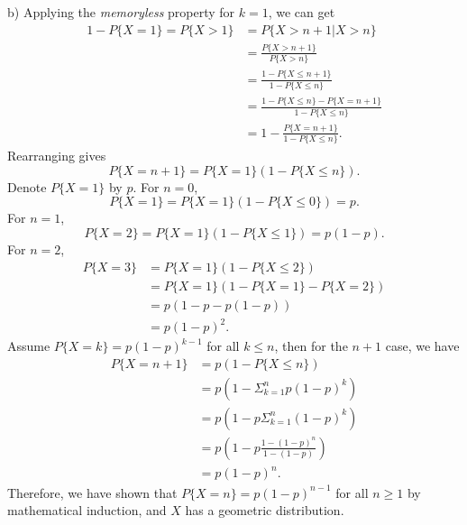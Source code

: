 \begin{solution}
  b) Applying the \textit{memoryless} property for $k=1$, we can get
  \begin{align*}
    1 - P\{X=1\} = P\{X>1\} &= P\{X>n+1|X>n\} \\
      &= \frac{P\{X>n+1\}}{P\{X>n\}} \\
      &= \frac{1 - P\{X\leq n+1\}}{1 - P\{X\leq n\}} \\
      &= \frac{1 - P\{X\leq n\} - P\{X= n+1\}}{1 - P\{X\leq n\}} \\
      &= 1 - \frac{P\{X= n+1\}}{1 - P\{X\leq n\}} .
  \end{align*}
  Rearranging gives
  \[ P\{X=n+1\} = P\{X=1\}(1-P\{X\leq n\}) .\]
  Denote $P\{X=1\}$ by $p$. For $n=0$,
  \[ P\{X=1\} = P\{X=1\}(1-P\{X\leq 0\}) = p .\]
  For $n=1$,
  \[ P\{X=2\} = P\{X=1\}(1-P\{X\leq 1\}) = p(1-p) .\]
  For $n=2$,
  \begin{align*}
    P\{X=3\} &= P\{X=1\}(1-P\{X\leq 2\}) \\
      &= P\{X=1\}(1-P\{X=1\}-P\{X=2\}) \\
      &= p(1-p-p(1-p)) \\
      &= p(1-p)^2.
  \end{align*}
  Assume $P\{X=k\}=p(1-p)^{k-1}$ for all $k\leq n$, then for the $n+1$ case, we have
  \begin{align*}
    P\{X=n+1\} &= p(1-P\{X\leq n\}) \\
      &= p(1 - \Sigma_{k=1}^n p(1-p)^k) \\
      &= p(1 - p\Sigma_{k=1}^n (1-p)^k) \\
      &= p(1 - p \frac{1-(1-p)^n}{1-(1-p)}) \\
      &= p(1-p)^n .
  \end{align*}
  Therefore, we have shown that $P\{X=n\} = p(1-p)^{n-1}$ for all $n\geq 1$ by mathematical induction, and $X$ has a geometric distribution.
\end{solution}

